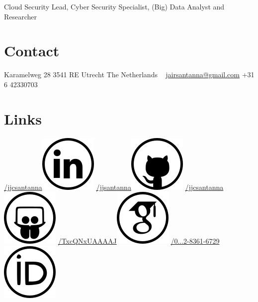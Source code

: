 \documentclass[print]{styles/friggeri-cv-mac} %
\begin{document}
{Cloud Security Lead, Cyber Security Specialist, (Big) Data Analyst and Researcher} 
\begin{aside} 
 \section{Contact}
 Karamelweg 28
 3541 RE Utrecht
 The Netherlands
~
\href{mailto:jairsantanna@gmail.com}{jairsantanna@gmail.com}
+31 6 42330703
~
\section{Links}\hspace{-1cm}
\hspace{-0.5cm}
\href{https://www.linkedin.com/in/jjcsantanna}{/jjcsantanna}\includegraphics[scale=0.3]{img/linkedin.png}
\href{https://github.com/jjsantanna}{/jjsantanna\includegraphics[scale=0.3]{img/github.png}}
\href{http://www.slideshare.net/jjcsantanna}{/jjcsantanna}\includegraphics[scale=0.3]{img/slideshare.png}
\href{https://scholar.google.com/citations?user=TxcQNxUAAAAJ}{/TxcQNxUAAAAJ}\includegraphics[scale=0.3]{img/googlescholar.png}
\href{http://orcid.org/0000-0002-8361-6729}{/0...2-8361-6729}\includegraphics[scale=0.3]{img/orcid.png}

\end{aside}
\end{document}
